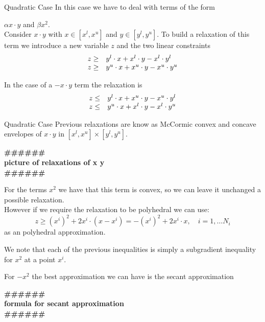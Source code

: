 \documentclass{beamer}
\newcommand{\todo}[1]
{\begin{tiny}
  \begin{center} {\color{red}
  \textbf{ {\#\#\#\hfill\#\#\#}\\{#1}\\\#\#\#\hfill\#\#\#}}
\end{center}
\end{tiny}} %
\begin{document}
\begin{frame}{Quadratic Case}
 In this case we have to deal with terms of the form

 $ \alpha x \cdot y $ and $\beta x^2$. \\
 Consider $x \cdot y$ with $x \in [x^l, x^u]$ and $y \in [y^l, y^u]$.
 To build a relaxation of this term we introduce a new variable $z$ and the two linear
 constraints
 \begin{displaymath}
   \begin{array}[h]{rl}
     z \geq & y^l \cdot x + x^l \cdot y - x^l \cdot y^l \\
     z \geq & y^u \cdot x + x^u \cdot y - x^u \cdot y^u \\
   \end{array}
 \end{displaymath}

 In the case of a $-x \cdot y$ term the relaxation is
 \begin{displaymath}
   \begin{array}[h]{rl}
     z \leq & y^l \cdot x + x^u \cdot y - x^u \cdot y^l \\
     z \leq & y^u \cdot x + x^l \cdot y - x^l \cdot y^u \\
   \end{array}
 \end{displaymath}
\end{frame}

\begin{frame}{Quadratic Case}
  Previous relaxations are know as McCormic convex and concave envelopes of $x \cdot y$
  in $[x^l, x^u] \times [y^l, y^u]$.
  \todo{picture of relaxations of x y}

  For the terms $x^2$ we have that this term is convex, so we can leave it unchanged a
  possible relaxation.\\
  However if we require the relaxation to be polyhedral we can use:
  \begin{displaymath}
    z \geq (x^i)^2 + 2 x^i \cdot (x-x^i) = -(x^i)^2 + 2 x^i \cdot x, \quad i=1,\dots N_i
  \end{displaymath}
  as an polyhedral approximation.

  We note that each of the previous inequalities is simply a subgradient inequality for
  $x^2$ at a point $x^i$.

  For $-x^2$ the best approximation we can have is the secant approximation
  \todo{formula for secant approximation}

\end{frame}
\end{document}

